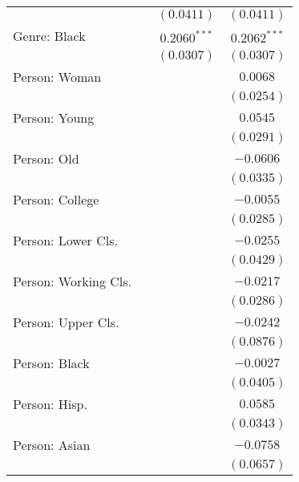 \begin{center}
\begin{longtable}{l c c c}
                     &                 & $(0.0411)$      & $(0.0411)$      \\
Genre: Black         &                 & $0.2060^{***}$  & $0.2062^{***}$  \\
                     &                 & $(0.0307)$      & $(0.0307)$      \\
Person: Woman        &                 &                 & $0.0068$        \\
                     &                 &                 & $(0.0254)$      \\
Person: Young        &                 &                 & $0.0545$        \\
                     &                 &                 & $(0.0291)$      \\
Person: Old          &                 &                 & $-0.0606$       \\
                     &                 &                 & $(0.0335)$      \\
Person: College      &                 &                 & $-0.0055$       \\
                     &                 &                 & $(0.0285)$      \\
Person: Lower Cls.   &                 &                 & $-0.0255$       \\
                     &                 &                 & $(0.0429)$      \\
Person: Working Cls. &                 &                 & $-0.0217$       \\
                     &                 &                 & $(0.0286)$      \\
Person: Upper Cls.   &                 &                 & $-0.0242$       \\
                     &                 &                 & $(0.0876)$      \\
Person: Black        &                 &                 & $-0.0027$       \\
                     &                 &                 & $(0.0405)$      \\
Person: Hisp.        &                 &                 & $0.0585$        \\
                     &                 &                 & $(0.0343)$      \\
Person: Asian        &                 &                 & $-0.0758$       \\
                     &                 &                 & $(0.0657)$      \\

\end{longtable}
\end{center}
